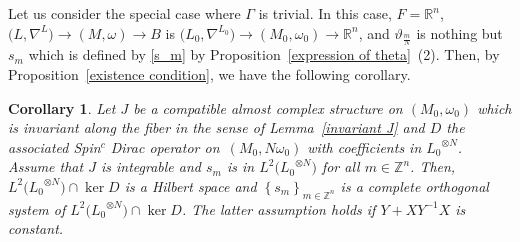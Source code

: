 \documentclass[10pt,a4paper]{amsart}
\numberwithin{equation}{section}
\newtheorem{Corollary}[Theorem]{Corollary}
\newcommand{\R}{\mathbb{R}}
\newcommand{\Z}{\mathbb{Z}}
\begin{document}
Let us consider the special case where $\Gamma$ is trivial. In this case, $F=\R^n$, ${\bigl(L,\nabla^L\bigr)\!\to\! (M,\omega)\!\to\! B}$ is $\bigl({L_0},\nabla^{L_0}\bigr)\to (M_0,\omega_0)\to \R^n$, and $\vartheta_{\frac{m}{N}}$ is nothing but $s_m$ which is defined by \eqref{s_m} by Proposition~\ref{expression of theta}~(2).
Then, by Proposition~\ref{existence condition}, we have the following corollary.
\begin{Corollary}\label{main0}
Let $J$ be a compatible almost complex structure on $(M_0,\omega_0)$ which is invariant along the fiber in the sense of Lemma~{\rm\ref{invariant J}} and $D$ the associated Spin${}^c$ Dirac operator on~$(M_0,N\omega_0)$ with coefficients in ${L_0}^{\otimes N}$. Assume that $J$ is integrable and $s_m$ is in $L^2\bigl({L_0}^{\otimes N}\bigr)$ for all $m\in \Z^n$.
Then, $L^2\bigl({L_0}^{\otimes N}\bigr)\cap \ker D$ is a Hilbert space and $\left\{s_m\right\}_{m\in \Z^n}$ is a complete orthogonal system of $L^2\bigl({L_0}^{\otimes N}\bigr)\cap \ker D$. The latter assumption holds if $Y+XY^{-1}X$ is constant.
\end{Corollary}
\end{document}
